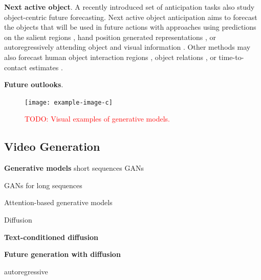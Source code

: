 \documentclass[smallextended,twocolumn,natbib]{svjour3}
\begin{document}
\noindent
\textbf{Next active object}. A recently introduced set of anticipation tasks also study object-centric future forecasting. Next active object anticipation aims to forecast the objects that will be used in future actions with approaches using predictions on the salient regions \citep{dessalene2021forecasting}, hand position generated representations \citep{jiang2021predicting}, or autoregressively attending object and visual information \citep{thakur2024anticipating}. Other methods may also forecast human object interaction regions \citep{liu2020forecasting,liu2022joint,roy2024interaction}, object relations \citep{roy2021action,zatsarynna2021multi}, or time-to-contact estimates \citep{mur2024aff}.

\noindent
\textbf{Future outlooks}.


\begin{figure}[t]
    \centering
    \texttt{[image: example-image-c]}
    \caption{\textcolor{red}{TODO: Visual examples of generative models.}}
\end{figure}


\subsection{Video Generation }

\noindent
\textbf{Generative models}
short sequences GANs
\citep{clark2019adversarial}
\citep{saito2017temporal}
\citep{luc2020transformation}
\citep{vondrick2016generating}
\citep{menapace2021playable}
\citep{yu2022generating}

GANs for long sequences
\citep{ge2022long}
\citep{brooks2022generating}
\citep{shen2023mostgan}
\citep{skorokhodov2022stylegan}

Attention-based generative models
\citep{han2022show}
\citep{hu2022make}

\noindent
Diffusion
\citep{ge2022long}
\citep{blattmann2023align}
\citep{nikankin2023sinfusion}
\citep{yang2023video}
\citep{ho2022video}
\citep{he2022latent}
\citep{wu2023tune}
\citep{harvey2022flexible}
\citep{yugenerating}
\citep{liu2024sora}
\citep{hong2022cogvideo}
\citep{yu2023avideo}
\citep{zeng2024make}
\citep{yu2024efficient}

\noindent
\textbf{Text-conditioned diffusion}
\citep{yan2021videogpt}
\citep{gupta2023photorealistic}
\citep{zhuang2024vlogger}

\noindent
\textbf{Future generation with diffusion}
\citep{fu2023tell}

autoregressive \citep{ho2022imagen}
\citep{villegas2022phenaki}
\citep{singer2023make}
\citep{wu2021godiva}
\citep{wu2022nuwa}
\end{document}
